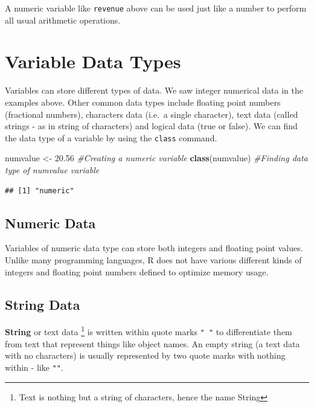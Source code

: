 \documentclass[]{krantz}
\makeatletter
\newenvironment{Shaded}{\begin{snugshade}}{\end{snugshade}}
\newcommand{\KeywordTok}[1]{\textcolor[rgb]{0.27,0.27,0.27}{\textbf{#1}}}
\newcommand{\FloatTok}[1]{\textcolor[rgb]{0.06,0.06,0.06}{#1}}
\newcommand{\StringTok}[1]{\textcolor[rgb]{0.5,0.5,0.5}{#1}}
\newcommand{\CommentTok}[1]{\textcolor[rgb]{0.56,0.35,0.01}{\textit{#1}}}
\newcommand{\NormalTok}[1]{#1}
\newenvironment{kframe}{%
\medskip{}
\setlength{\fboxsep}{.8em}
 \def\at@end@of@kframe{}%
 \ifinner\ifhmode%
  \def\at@end@of@kframe{\end{minipage}}%
  \begin{minipage}{\columnwidth}%
 \fi\fi%
 \def\FrameCommand##1{\hskip\@totalleftmargin \hskip-\fboxsep
 \colorbox{shadecolor}{##1}\hskip-\fboxsep
     \hskip-\linewidth \hskip-\@totalleftmargin \hskip\columnwidth}%
 \MakeFramed {\advance\hsize-\width
   \@totalleftmargin\z@ \linewidth\hsize
   \@setminipage}}%
 {\par\unskip\endMakeFramed%
 \at@end@of@kframe}
\renewenvironment{Shaded}{\begin{kframe}}{\end{kframe}}
\theoremstyle{definition}
\theoremstyle{definition}
\theoremstyle{definition}
\theoremstyle{remark}
\makeatother
\begin{document}
A numeric variable like \texttt{revenue} above can be used just like a
number to perform all usual arithmetic operations.

\section{Variable Data Types}\label{variable-data-types}

Variables can store different types of data. We saw integer numerical
data in the examples above. Other common data types include floating
point numbers (fractional numbers), characters data (i.e.~a single
character), text data (called strings - as in string of characters) and
logical data (true or false). We can find the data type of a variable by
using the \texttt{class} command.

\begin{Shaded}
\begin{Highlighting}[]
\NormalTok{numvalue <-}\StringTok{ }\FloatTok{20.56} \CommentTok{#Creating a numeric variable}
\KeywordTok{class}\NormalTok{(numvalue) }\CommentTok{#Finding data type of numvalue variable}
\end{Highlighting}
\end{Shaded}

\begin{verbatim}
## [1] "numeric"
\end{verbatim}

\subsection{Numeric Data}\label{numeric-data}

Variables of numeric data type can store both integers and floating
point values. Unlike many programming languages, R does not have various
different kinds of integers and floating point numbers defined to
optimize memory usage.

\subsection{String Data}\label{string-data}

\textbf{String} or text data \footnote{Text is nothing but a string of
  characters, hence the name String} is written within quote marks
\texttt{"\ "} to differentiate them from text that represent things like
object names. An empty string (a text data with no characters) is
usually represented by two quote marks with nothing within - like
\texttt{""}.
\end{document}
